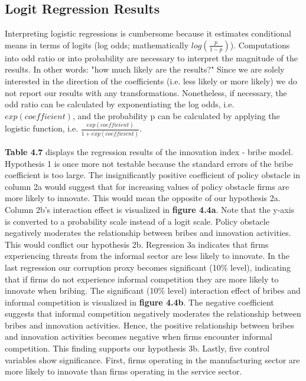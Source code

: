 \subsection{Logit Regression Results}
Interpreting logistic regressions is cumbersome because it estimates conditional means in terms of logits (log odds; mathematically $log(\frac{p}{1-p})$). Computations into odd ratio or into probability are necessary to interpret the magnitude of the results. In other words: "how much likely are the results?" Since we are solely interested in the direction of the coefficients (i.e. less likely or more likely) we do not report our results with any transformations. Nonetheless, if necessary, the odd ratio can be calculated by exponentiating the log odds, i.e. $exp(coefficient)$, and the probability p can be calculated by applying the logistic function, i.e. $\frac{exp(coefficient)}{1+exp(coefficient)}$.

\textbf{Table 4.7} displays the regression results of the innovation index - bribe model. Hypothesis 1 is once more not testable because the standard errors of the bribe coefficient is too large. The insignificantly positive coefficient of policy obstacle in column 2a would suggest that for increasing values of policy obstacle firms are more likely to innovate. This would mean the opposite of our hypothesis 2a. Column 2b's interaction effect is visualized in \textbf{figure 4.4a}. Note that the y-axis is converted to a probability scale instead of a logit scale. Policy obstacle negatively moderates the relationship between bribes and innovation activities. This would conflict our hypothesis 2b. Regression 3a indicates that firms experiencing threats from the informal sector are less likely to innovate. In the last regression our corruption proxy becomes significant (10\% level), indicating that if firms do not experience informal competition they are more likely to innovate when bribing. The significant (10\% level) interaction effect of bribes and informal competition is visualized in \textbf{figure 4.4b}. The negative coefficient suggests that informal competition negatively moderates the relationship between bribes and innovation activities. Hence, the positive relationship between bribes and innovation activities becomes negative when firms encounter informal competition. This finding supports our hypothesis 3b. Lastly, five control variables show significance. First, firms operating in the manufacturing sector are more likely to innovate than firms operating in the service sector.  

